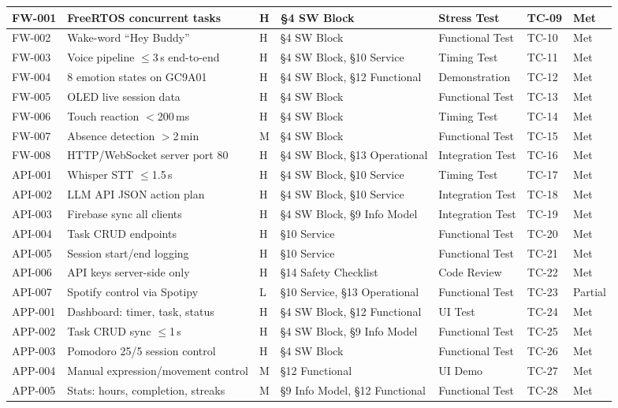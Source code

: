\documentclass[12pt,a4paper]{article}
\begin{document}
\begin{center}
\begin{tabular}{|C{0.07\textwidth}|L{0.22\textwidth}|C{0.04\textwidth}|L{0.22\textwidth}|L{0.13\textwidth}|C{0.06\textwidth}|C{0.08\textwidth}|}
FW-001 & FreeRTOS concurrent tasks & H &
\S4 SW Block & Stress Test & TC-09 & Met \\ \hline
FW-002 & Wake-word ``Hey Buddy'' & H &
\S4 SW Block & Functional Test & TC-10 & Met \\ \hline
FW-003 & Voice pipeline $\leq$3\,s end-to-end & H &
\S4 SW Block, \S10 Service & Timing Test & TC-11 & Met \\ \hline
FW-004 & 8 emotion states on GC9A01 & H &
\S4 SW Block, \S12 Functional & Demonstration & TC-12 & Met \\ \hline
FW-005 & OLED live session data & H &
\S4 SW Block & Functional Test & TC-13 & Met \\ \hline
FW-006 & Touch reaction $<$200\,ms & H &
\S4 SW Block & Timing Test & TC-14 & Met \\ \hline
FW-007 & Absence detection $>$2\,min & M &
\S4 SW Block & Functional Test & TC-15 & Met \\ \hline
FW-008 & HTTP/WebSocket server port 80 & H &
\S4 SW Block, \S13 Operational & Integration Test & TC-16 & Met \\ \hline
API-001 & Whisper STT $\leq$1.5\,s & H &
\S4 SW Block, \S10 Service & Timing Test & TC-17 & Met \\ \hline
API-002 & LLM API JSON action plan & H &
\S4 SW Block, \S10 Service & Integration Test & TC-18 & Met \\ \hline
API-003 & Firebase sync all clients & H &
\S4 SW Block, \S9 Info Model & Integration Test & TC-19 & Met \\ \hline
API-004 & Task CRUD endpoints & H &
\S10 Service & Functional Test & TC-20 & Met \\ \hline
API-005 & Session start/end logging & H &
\S10 Service & Functional Test & TC-21 & Met \\ \hline
API-006 & API keys server-side only & H &
\S14 Safety Checklist & Code Review & TC-22 & Met \\ \hline
API-007 & Spotify control via Spotipy & L &
\S10 Service, \S13 Operational & Functional Test & TC-23 & Partial \\ \hline
APP-001 & Dashboard: timer, task, status & H &
\S4 SW Block, \S12 Functional & UI Test & TC-24 & Met \\ \hline
APP-002 & Task CRUD sync $\leq$1\,s & H &
\S4 SW Block, \S9 Info Model & Functional Test & TC-25 & Met \\ \hline
APP-003 & Pomodoro 25/5 session control & H &
\S4 SW Block & Functional Test & TC-26 & Met \\ \hline
APP-004 & Manual expression/movement control & M &
\S12 Functional & UI Demo & TC-27 & Met \\ \hline
APP-005 & Stats: hours, completion, streaks & M &
\S9 Info Model, \S12 Functional & Functional Test & TC-28 & Met \\ \hline
\end{tabular}
\end{center}
\end{document}
